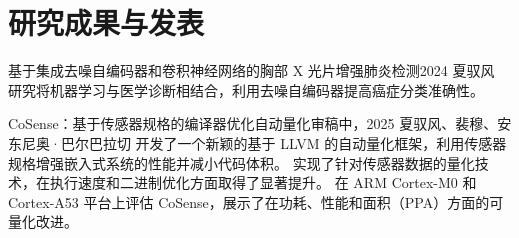 \section{研究成果与发表}
  \resumeSubHeadingListStart
    \resumeSubheading
      {基于集成去噪自编码器和卷积神经网络的胸部 X 光片增强肺炎检测}{2024}
      {夏驭风}{}
      \resumeItemListStart
          {研究将机器学习与医学诊断相结合，利用去噪自编码器提高癌症分类准确性。}
      \resumeItemListEnd

    \resumeSubheading
      {CoSense：基于传感器规格的编译器优化自动量化}{审稿中，2025}
      {夏驭风、裴穆、安东尼奥·巴尔巴拉切}{}
      \resumeItemListStart
          {开发了一个新颖的基于 LLVM 的自动量化框架，利用传感器规格增强嵌入式系统的性能并减小代码体积。}
          {实现了针对传感器数据的量化技术，在执行速度和二进制优化方面取得了显著提升。}
          {在 ARM Cortex-M0 和 Cortex-A53 平台上评估 CoSense，展示了在功耗、性能和面积（PPA）方面的可量化改进。}
      \resumeItemListEnd

  \resumeSubHeadingListEnd